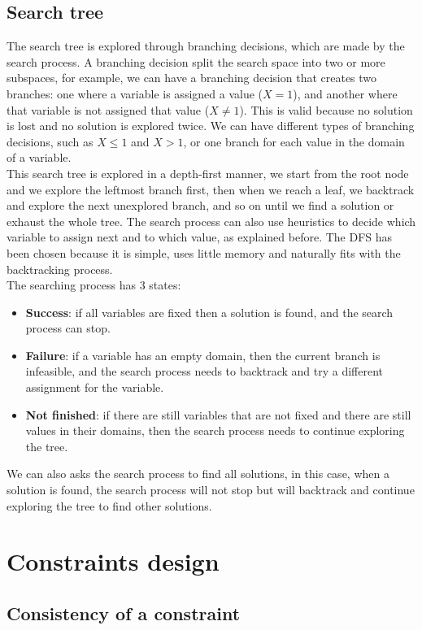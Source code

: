 \documentclass[12pt, openany]{report}
\theoremstyle{definition}
\begin{document}
\section{Search tree}
The search tree is explored through branching decisions, which are made by the search process. A branching decision split the search space into two or more subspaces, for example, we can have a branching decision that creates two branches: one where a variable is assigned a value ($X = 1$), and another where that variable is not assigned that value ($X \neq 1$). This is valid because no solution is lost and no solution is explored twice. We can have different types of branching decisions, such as $X \leq 1$ and $X > 1$, or one branch for each value in the domain of a variable.\\
This search tree is explored in a depth-first manner, we start from the root node and we explore the leftmost branch first, then when we reach a leaf, we backtrack and explore the next unexplored branch, and so on until we find a solution or exhaust the whole tree. The search process can also use heuristics to decide which variable to assign next and to which value, as explained before. The DFS has been chosen because it is simple, uses little memory and naturally fits with the backtracking process.\\
The searching process has 3 states:
\begin{itemize}
    \item \textbf{Success}: if all variables are fixed then a solution is found, and the search process can stop.
    \item \textbf{Failure}: if a variable has an empty domain, then the current branch is infeasible, and the search process needs to backtrack and try a different assignment for the variable.
    \item \textbf{Not finished}: if there are still variables that are not fixed and there are still values in their domains, then the search process needs to continue exploring the tree.
\end{itemize}
We can also asks the search process to find all solutions, in this case, when a solution is found, the search process will not stop but will backtrack and continue exploring the tree to find other solutions.
\chapter{Constraints design}
\section{Consistency of a constraint}
\end{document}
